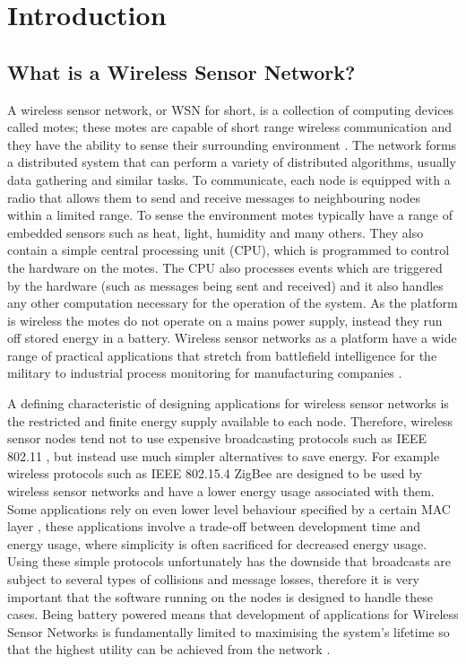 \section{Introduction}

\subsection{What is a Wireless Sensor Network?}

A wireless sensor network, or WSN for short, is a collection of computing devices called motes; these motes are capable of short range wireless communication and they have the ability to sense their surrounding environment \cite{Mica2002}. The network forms a distributed system that can perform a variety of distributed algorithms, usually data gathering and similar tasks. To communicate, each node is equipped with a radio that allows them to send and receive messages to neighbouring nodes within a limited range. To sense the environment motes typically have a range of embedded sensors such as heat, light, humidity and many others. They also contain a simple central processing unit (CPU), which is programmed to control the hardware on the motes. The CPU also processes events which are triggered by the hardware (such as messages being sent and received) and it also handles any other computation necessary for the operation of the system. As the platform is wireless the motes do not operate on a mains power supply, instead they run off stored energy in a battery. Wireless sensor networks as a platform have a wide range of practical applications that stretch from battlefield intelligence for the military \cite{Akyildiz2002393,1368897,1457970} to industrial process monitoring for manufacturing companies \cite{1219475,4796311,4109116}.

A defining characteristic of designing applications for wireless sensor networks is the restricted and finite energy supply available to each node. Therefore, wireless sensor nodes tend not to use expensive broadcasting protocols such as IEEE 802.11 \cite{Mica2002}, but instead use much simpler alternatives to save energy. For example wireless protocols such as IEEE 802.15.4 ZigBee \cite{1253873, 4014617} are designed to be used by wireless sensor networks and have a lower energy usage associated with them. Some applications rely on even lower level behaviour specified by a certain MAC layer \cite{5751321,Polastre:2004:VLP:1031495.1031508,Buettner:2006:XSP:1182807.1182838}, these applications involve a trade-off between development time and energy usage, where simplicity is often sacrificed for decreased energy usage. Using these simple protocols unfortunately has the downside that broadcasts are subject to several types of collisions and message losses, therefore it is very important that the software running on the nodes is designed to handle these cases. Being battery powered means that development of applications for Wireless Sensor Networks is fundamentally limited to maximising the system's lifetime so that the highest utility can be achieved from the network \cite{4025017}.


